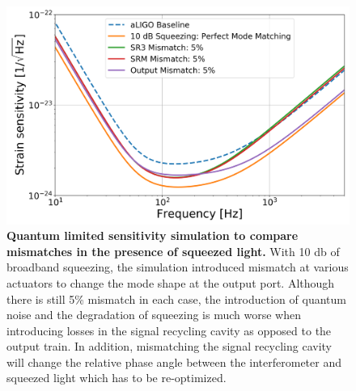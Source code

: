 \begin{figure}[h]
	\centering
	\includegraphics[width=1.0 \textwidth]{../Figures/QM_sens_compare_mismatches.png}
	\caption[Quantum limited sensitivity simulation to compare mismatches in the presence of squeezed light.]
	{\textbf{Quantum limited sensitivity simulation to compare mismatches in the presence of squeezed light.} 
		With 10 db of broadband squeezing, the simulation introduced mismatch at various actuators to change the mode shape at the output port.  Although there is still 5\% mismatch in each case, the introduction of quantum noise and the degradation of squeezing is much worse when introducing losses in the signal recycling cavity as opposed to the output train.  In addition, mismatching the signal recycling cavity will change the relative phase angle between the interferometer and squeezed light which has to be re-optimized.	
	}
	\label{fig:QM_lim_sens_mismatch}
\end{figure}

